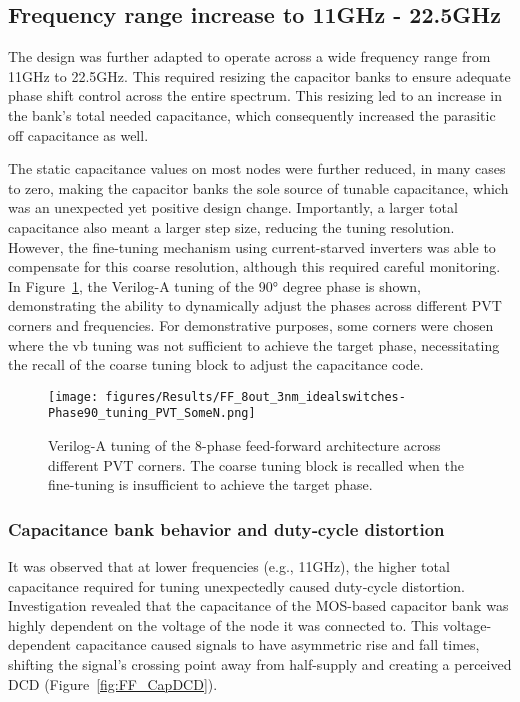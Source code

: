\subsection{Frequency range increase to 11GHz - 22.5GHz}\label{sec:freq_range}

The design was further adapted to operate across a wide frequency range from 11GHz to 22.5GHz. This required resizing the capacitor banks to ensure adequate phase shift control across the entire spectrum. This resizing led to an increase in the bank's total needed capacitance, which consequently increased the parasitic off capacitance as well.

The static capacitance values on most nodes were further reduced, in many cases to zero, making the capacitor banks the sole source of tunable capacitance, which was an unexpected yet positive design change. Importantly, a larger total capacitance also meant a larger step size, reducing the tuning resolution. However, the fine-tuning mechanism using current-starved inverters was able to compensate for this coarse resolution, although this required careful monitoring. In Figure~\ref{fig:FF_8out_CSI_dynamicTuning_PVT}, the Verilog-A tuning of the \ang{90} degree phase is shown, demonstrating the ability to dynamically adjust the phases across different PVT corners and frequencies. For demonstrative purposes, some corners were chosen where the vb tuning was not sufficient to achieve the target phase, necessitating the recall of the coarse tuning block to adjust the capacitance code.

\begin{figure}[h]
  \centering
  \texttt{[image: figures/Results/FF\_8out\_3nm\_idealswitches-Phase90\_tuning\_PVT\_SomeN.png]}
  \caption{Verilog-A tuning of the 8-phase feed-forward architecture across different PVT corners. The coarse tuning block is recalled when the fine-tuning is insufficient to achieve the target phase.}
  \label{fig:FF_8out_CSI_dynamicTuning_PVT}
\end{figure}

\subsubsection{Capacitance bank behavior and duty‑cycle distortion}

It was observed that at lower frequencies (e.g., 11GHz), the higher total capacitance required for tuning unexpectedly caused duty‑cycle distortion. Investigation revealed that the capacitance of the MOS-based capacitor bank was highly dependent on the voltage of the node it was connected to. This voltage-dependent capacitance caused signals to have asymmetric rise and fall times, shifting the signal's crossing point away from half-supply and creating a perceived DCD (Figure~\ref{fig:FF_CapDCD}).

